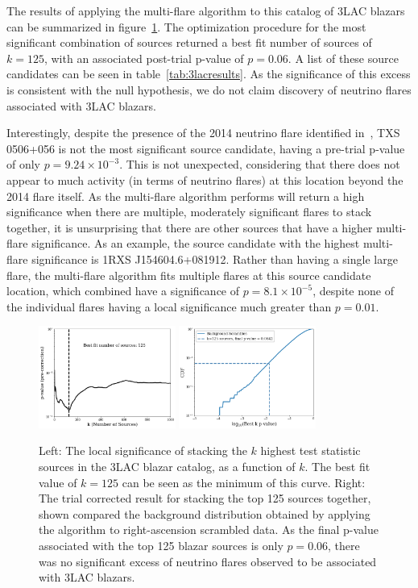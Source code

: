 The results of applying the multi-flare algorithm to this catalog of 3LAC blazars can be summarized in figure~\ref{fig:3lacresults}. The optimization procedure for the most significant combination of sources returned a best fit number of sources of $k=125$, with an associated post-trial p-value of $p=0.06$. A list of these source candidates can be seen in table~\ref{tab:3lacresults}. As the significance of this excess is consistent with the null hypothesis, we do not claim discovery of neutrino flares associated with 3LAC blazars. 

Interestingly, despite the presence of the 2014 neutrino flare identified in~\cite{TXS_Archival}, TXS 0506+056 is not the most significant source candidate, having a pre-trial p-value of only $p=9.24 \times 10^{-3}$. This is not unexpected, considering that there does not appear to much activity (in terms of neutrino flares) at this location beyond the 2014 flare itself. As the multi-flare algorithm performs will return a high significance when there are multiple, moderately significant flares to stack together, it is unsurprising that there are other sources that have a higher multi-flare significance. As an example, the source candidate with the highest multi-flare significance is 1RXS J154604.6+081912. Rather than having a single large flare, the multi-flare algorithm fits multiple flares at this source candidate location, which combined have a significance of $p=8.1 \times 10^{-5}$, despite none of the individual flares having a local significance much greater than $p=0.01$.

\begin{figure}[h]
\centering
\includegraphics[width=0.4\textwidth]{figs/3lac_pcurve.png}
\includegraphics[width=0.4\textwidth]{figs/3lacresult.png}
\caption{Left: The local significance of stacking the $k$ highest test statistic sources in the 3LAC blazar catalog, as a function of $k$. The best fit value of $k=125$ can be seen as the minimum of this curve. Right: The trial corrected result for stacking the top 125 sources together, shown compared the background distribution obtained by applying the algorithm to right-ascension scrambled data. As the final p-value associated with the top 125 blazar sources is only $p=0.06$, there was no significant excess of neutrino flares observed to be associated with 3LAC blazars.}
\label{fig:3lacresults}
\end{figure}

